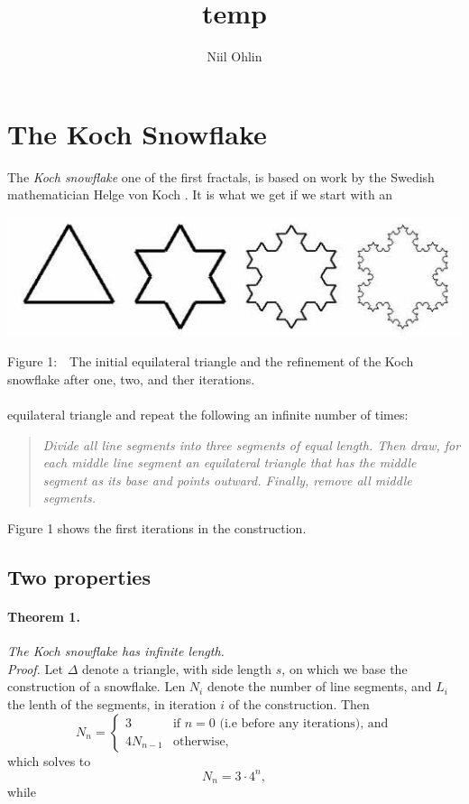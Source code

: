 \documentclass[a4paper]{article}
\begin{document}
\title{temp}
\author{Niil Ohlin}
\date{}
\maketitle

\section{The Koch Snowflake}
The \emph{Koch snowflake} one of the first fractals, is based on work by the
Swedish mathematician Helge von Koch \cite{aoeu}. It is what we get if we
start with an 
\begin{center}
	\includegraphics[scale=0.4]{snowflake.jpg}
\end{center}
Figure 1:$\quad$The initial equilateral triangle and the refinement of the Koch
snowflake after one, two, and ther iterations.\\
\\
equilateral triangle and repeat the following an infinite number of times:

\begin{quote}
\emph{Divide all line segments into three segments of equal length. Then draw,
	for each middle line segment an equilateral triangle that has the middle
	segment as its base and points outward. Finally, remove all middle segments.
	}
\end{quote}
Figure 1 shows the first iterations in the construction. 


\subsection{Two properties}
\paragraph{Theorem 1.} \emph{The Koch snowflake has infinite length.}\\
\emph{Proof.} Let $\Delta$ denote a triangle, with side length $s$, on which
we base the construction of a snowflake. Len $N_i$ denote the number of line
segments, and $L_i$ the lenth of the segments, in iteration $i$ of the 
construction. Then
$$
	N_n = 
	\begin{cases}
		3 &\text{if } n = 0 \text{ (i.e before any iterations), and} \\
		4N_{n-1} &\text{otherwise,}
	\end{cases}
$$
which solves to
\begin{equation}
	N_n = 3 \cdot 4^n,
\end{equation}
while
\newcommand{\uberfrac}[1]{
	= \frac {L_{n - #1}} {3^#1}
}
\end{document}
